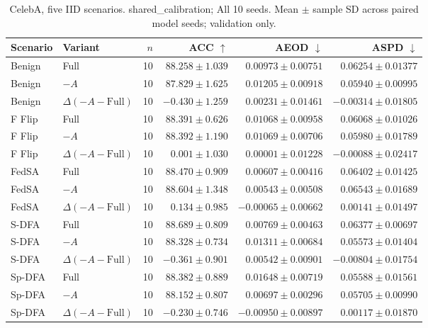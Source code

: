 \begin{table}[t]
\centering
\small
\caption{CelebA, five IID scenarios. shared\_calibration; All 10 seeds. Mean $\pm$ sample SD across paired model seeds; validation only.}
\begin{tabular}{llrrrr}
\toprule
Scenario & Variant & $n$ & ACC $\uparrow$ & AEOD $\downarrow$ & ASPD $\downarrow$ \\
\midrule
Benign & Full & 10 & $88.258 \pm 1.039$ & $0.00973 \pm 0.00751$ & $0.06254 \pm 0.01377$ \\
Benign & $-A$ & 10 & $87.829 \pm 1.625$ & $0.01205 \pm 0.00918$ & $0.05940 \pm 0.00995$ \\
Benign & $\Delta(-A-\mathrm{Full})$ & 10 & $-0.430 \pm 1.259$ & $0.00231 \pm 0.01461$ & $-0.00314 \pm 0.01805$ \\
F Flip & Full & 10 & $88.391 \pm 0.626$ & $0.01068 \pm 0.00958$ & $0.06068 \pm 0.01026$ \\
F Flip & $-A$ & 10 & $88.392 \pm 1.190$ & $0.01069 \pm 0.00706$ & $0.05980 \pm 0.01789$ \\
F Flip & $\Delta(-A-\mathrm{Full})$ & 10 & $0.001 \pm 1.030$ & $0.00001 \pm 0.01228$ & $-0.00088 \pm 0.02417$ \\
FedSA & Full & 10 & $88.470 \pm 0.909$ & $0.00607 \pm 0.00416$ & $0.06402 \pm 0.01425$ \\
FedSA & $-A$ & 10 & $88.604 \pm 1.348$ & $0.00543 \pm 0.00508$ & $0.06543 \pm 0.01689$ \\
FedSA & $\Delta(-A-\mathrm{Full})$ & 10 & $0.134 \pm 0.985$ & $-0.00065 \pm 0.00662$ & $0.00141 \pm 0.01497$ \\
S-DFA & Full & 10 & $88.689 \pm 0.809$ & $0.00769 \pm 0.00463$ & $0.06377 \pm 0.00697$ \\
S-DFA & $-A$ & 10 & $88.328 \pm 0.734$ & $0.01311 \pm 0.00684$ & $0.05573 \pm 0.01404$ \\
S-DFA & $\Delta(-A-\mathrm{Full})$ & 10 & $-0.361 \pm 0.901$ & $0.00542 \pm 0.00901$ & $-0.00804 \pm 0.01754$ \\
Sp-DFA & Full & 10 & $88.382 \pm 0.889$ & $0.01648 \pm 0.00719$ & $0.05588 \pm 0.01561$ \\
Sp-DFA & $-A$ & 10 & $88.152 \pm 0.807$ & $0.00697 \pm 0.00296$ & $0.05705 \pm 0.00990$ \\
Sp-DFA & $\Delta(-A-\mathrm{Full})$ & 10 & $-0.230 \pm 0.746$ & $-0.00950 \pm 0.00897$ & $0.00117 \pm 0.01870$ \\
\bottomrule
\end{tabular}
\end{table}

